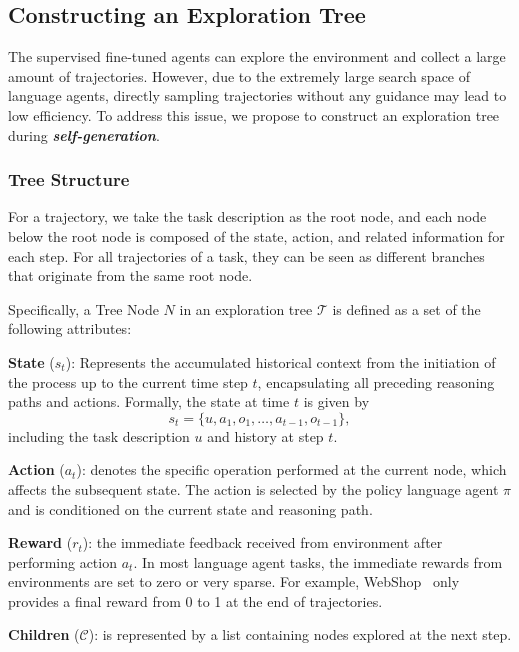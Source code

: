 \subsection{Constructing an Exploration Tree}
The supervised fine-tuned agents can explore the environment and collect a large amount of trajectories. However, due to the extremely large search space of language agents, directly sampling trajectories without any guidance may lead to low efficiency. To address this issue, we propose to construct an exploration tree during \textbf{\textit{self-generation}}.



\subsubsection{Tree Structure}
For a trajectory, we take the task description as the root node, and each node below the root node is composed of the state, action, and related information for each step. For all trajectories of a task, they can be seen as different branches that originate from the same root node.

Specifically, a Tree Node $N$ in an exploration tree $\mathcal{T}$ is defined as a set of the following attributes:

\textbf{State} ($s_t$): Represents the accumulated historical context from the initiation of the process up to the current time step $t$, encapsulating all preceding reasoning paths and actions. Formally, the state at time $t$ is given by
\begin{equation}
\label{equation:state_definition}
    s_t = \{u, a_1, o_1, \ldots, a_{t-1}, o_{t-1} \},
\end{equation}
    including the task description $u$ and history at step $t$.
    
    
\textbf{Action} ($a_t$): denotes the specific operation performed at the current node, which affects the subsequent state. The action is selected by the policy language agent $\pi$ and is conditioned on the current state and reasoning path.
    
    
\textbf{Reward} ($r_t$): the immediate feedback received from environment after performing action $a_t$. In most language agent tasks, the immediate rewards from environments are set to zero or very sparse. For example, WebShop~\citep{yao2022webshop} only provides a final reward from 0 to 1 at the end of trajectories. 


\textbf{Children} ($\mathcal{C}$): is represented by a list containing nodes explored at the next step.


